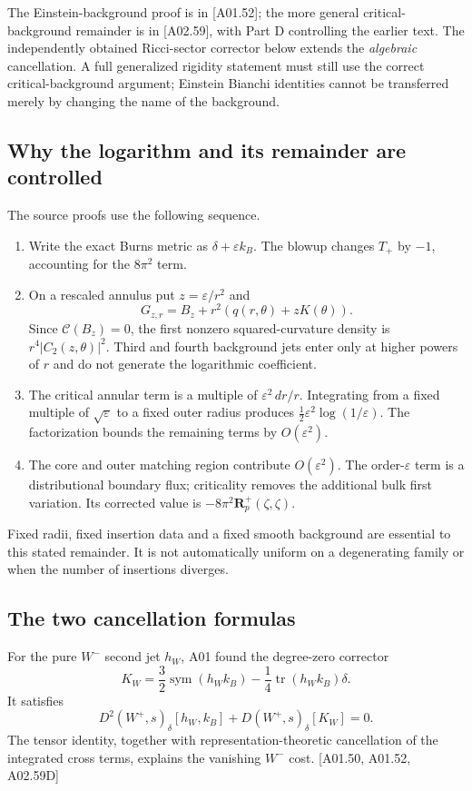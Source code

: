 \documentclass[11pt]{article}
\newcommand{\tr}{\operatorname{tr}}
\newcommand{\Rplus}{\mathbf R^+}
\newcommand{\sref}[1]{\textsf{[#1]}}
\theoremstyle{remark}
\begin{document}
The Einstein-background proof is in \sref{A01.52}; the more general
critical-background remainder is in \sref{A02.59}, with Part D controlling
the earlier text. The independently obtained Ricci-sector corrector below
extends the \emph{algebraic} cancellation. A full generalized rigidity
statement must still use the correct critical-background argument; Einstein
Bianchi identities cannot be transferred merely by changing the name of
the background.

\subsection{Why the logarithm and its remainder are controlled}
The source proofs use the following sequence.
\begin{enumerate}
\item Write the exact Burns metric as $\delta+\varepsilon k_B$. The
blowup changes $T_+$ by $-1$, accounting for the $8\pi^2$ term.
\item On a rescaled annulus put $z=\varepsilon/r^2$ and
\[
 G_{z,r}=B_z+r^2(q(r,\theta)+zK(\theta)).
\]
Since $\mathscr C(B_z)=0$, the first nonzero squared-curvature density is
$r^4|C_2(z,\theta)|^2$. Third and fourth background jets enter only at
higher powers of $r$ and do not generate the logarithmic coefficient.
\item The critical annular term is a multiple of
$\varepsilon^2\,dr/r$. Integrating from a fixed multiple of
$\sqrt\varepsilon$ to a fixed outer radius produces
$\tfrac12\varepsilon^2\log(1/\varepsilon)$.
The factorization bounds the remaining terms by $O(\varepsilon^2)$.
\item The core and outer matching region contribute $O(\varepsilon^2)$.
The order-$\varepsilon$ term is a distributional boundary flux; criticality
removes the additional bulk first variation. Its corrected value is
$-8\pi^2\Rplus_p(\zeta,\zeta)$.
\end{enumerate}
Fixed radii, fixed insertion data and a fixed smooth background are essential
to this stated remainder. It is not automatically uniform on a degenerating
family or when the number of insertions diverges.

\subsection{The two cancellation formulas}
For the pure $W^-$ second jet $h_W$, A01 found the degree-zero corrector
\[
 K_W=\frac32\operatorname{sym}(h_Wk_B)
       -\frac14\tr(h_Wk_B)\delta.
\]
It satisfies
\[
 D^2(W^+,s)_\delta[h_W,k_B]+D(W^+,s)_\delta[K_W]=0.
\]
The tensor identity, together with representation-theoretic cancellation of
the integrated cross terms, explains the vanishing $W^-$ cost.
\sref{A01.50, A01.52, A02.59D}
\end{document}
